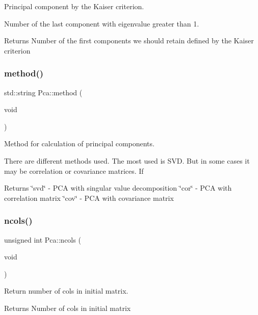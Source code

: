 Principal component by the Kaiser criterion. 

Number of the last component with eigenvalue greater than 1. \begin{DoxyReturn}{Returns}
Number of the first components we should retain defined by the Kaiser criterion 
\end{DoxyReturn}
\hypertarget{classPca_aecaeb63b64fe48f9307ee89075ed6929}{}\label{classPca_aecaeb63b64fe48f9307ee89075ed6929} 
\subsubsection{\texorpdfstring{method()}{method()}}
{\footnotesize\ttfamily std\+::string Pca\+::method (\begin{DoxyParamCaption}\item[{void}]{ }\end{DoxyParamCaption})}



Method for calculation of principal components. 

There are different methods used. The most used is S\+VD. But in some cases it may be correlation or covariance matrices. If \begin{DoxyReturn}{Returns}
\char`\"{}svd\char`\"{} -\/ P\+CA with singular value decomposition \char`\"{}cor\char`\"{} -\/ P\+CA with correlation matrix \char`\"{}cov\char`\"{} -\/ P\+CA with covariance matrix 
\end{DoxyReturn}
\hypertarget{classPca_ab3e3ef5de29c495ad8b8ad7ed0ae2bbe}{}\label{classPca_ab3e3ef5de29c495ad8b8ad7ed0ae2bbe} 
\subsubsection{\texorpdfstring{ncols()}{ncols()}}
{\footnotesize\ttfamily unsigned int Pca\+::ncols (\begin{DoxyParamCaption}\item[{void}]{ }\end{DoxyParamCaption})}



Return number of cols in initial matrix. 

\begin{DoxyReturn}{Returns}
Number of cols in initial matrix 
\end{DoxyReturn}
\hypertarget{classPca_a1de7db7c35c005e7920dd95579ae820b}{}\label{classPca_a1de7db7c35c005e7920dd95579ae820b} 
